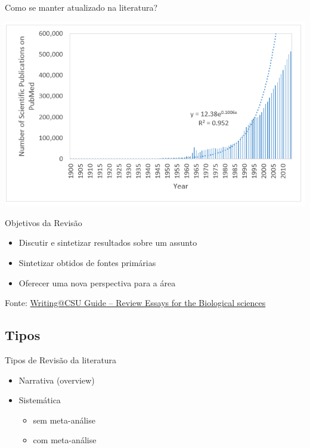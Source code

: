 \documentclass{beamer}
\begin{document}
\begin{frame}{Como se manter atualizado na literatura?}
  \begin{center}
    \includegraphics[width=\textwidth]{Revisao_resumo/pubs-year}
  \end{center}
\end{frame}

\begin{frame}{Objetivos da Revisão}
  \begin{itemize}
    \footnotesize
  \item Discutir e sintetizar resultados sobre um assunto
    \bigskip
  \item Sintetizar obtidos de fontes primárias
    \bigskip
  \item Oferecer uma nova perspectiva para a área
  \end{itemize}

  \vfill
  \scriptsize
  \hfill Fonte: \href{https://writing.colostate.edu/guides/guide.cfm?guideid=79}
  {\tiny Writing@CSU Guide -- Review Essays for the Biological sciences}
\end{frame}

\subsection{Tipos}

\begin{frame}{Tipos de Revisão da literatura}
  \begin{itemize}
    \footnotesize
  \item Narrativa (overview)
    \bigskip
  \item Sistemática
    \begin{itemize}
      \scriptsize
      \medskip
    \item sem meta-análise
      \smallskip
    \item com meta-análise
    \end{itemize}
  \end{itemize}
\end{frame}
\end{document}
